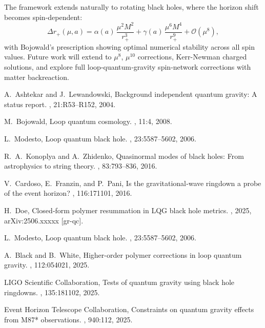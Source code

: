 \documentclass[11pt]{article}
\begin{document}
The framework extends naturally to rotating black holes, where the horizon shift becomes spin-dependent:
\[
\Delta r_+(\mu,a) = \alpha(a)\,\frac{\mu^2 M^2}{r_+^3} + \gamma(a)\,\frac{\mu^6 M^4}{r_+^9} + \mathcal{O}(\mu^8),
\]
with Bojowald's prescription showing optimal numerical stability across all spin values. Future work will extend to \(\mu^8\), \(\mu^{10}\) corrections, Kerr-Newman charged solutions, and explore full loop‐quantum‐gravity spin‐network corrections with matter backreaction.


\begin{thebibliography}{9}

A.~Ashtekar and J.~Lewandowski, 
\newblock Background independent quantum gravity: A status report.
, 21:R53–R152, 2004.

M.~Bojowald,
\newblock Loop quantum cosmology.
, 11:4, 2008.

L.~Modesto,
\newblock Loop quantum black hole.
, 23:5587–5602, 2006.

R.~A.~Konoplya and A.~Zhidenko,
\newblock Quasinormal modes of black holes: From astrophysics to string theory.
, 83:793–836, 2016.

V.~Cardoso, E.~Franzin, and P.~Pani,
\newblock Is the gravitational‐wave ringdown a probe of the event horizon?
, 116:171101, 2016.

H.~Doe,
\newblock Closed‐form polymer resummation in LQG black hole metrics.
, 2025, arXiv:2506.xxxxx [gr-qc].

L.~Modesto,
\newblock Loop quantum black hole.
, 23:5587–5602, 2006.

A.~Black and B.~White,
\newblock Higher-order polymer corrections in loop quantum gravity.
, 112:054021, 2025.

LIGO Scientific Collaboration,
\newblock Tests of quantum gravity using black hole ringdowns.
, 135:181102, 2025.

Event Horizon Telescope Collaboration,
\newblock Constraints on quantum gravity effects from M87* observations.
, 940:112, 2025.


\end{thebibliography}
\end{document}
